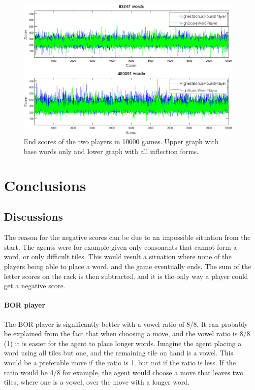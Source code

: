 \documentclass[a4paper, 12pt]{report}
\begin{document}
\begin{figure}[h]
\centering
\includegraphics[scale=0.4]{Highest_Bonus_Round_vs_High_Score_Word_10000_cropped}
\caption {End scores of the two players in 10000 games. Upper graph with base words only and lower graph with all inflection forms.}
\label{fig:bs+hsw+totalscores}
\end{figure}



\chapter{Conclusions}
\section{Discussions}
The reason for the negative scores can be due to an impossible situation from the start. The agents were for example given only consonants that cannot form a word, or only difficult tiles. This would result a situation where none of the players being able to place a word, and the game eventually ends. The sum of the letter scores on the rack is then subtracted, and it is the only way a player could get a negative score.

\subsubsection{BOR player}
The BOR player is significantly better with a vowel ratio of 8/8. It can probably be explained from the fact that when choosing a move, and the vowel ratio is 8/8 (1) it is easier for the agent to place longer words. Imagine the agent placing a word using all tiles but one, and the remaining tile on hand is a vowel. This would be a preferable move if the ratio is 1, but not if the ratio is less. If the ratio would be 4/8 for example, the agent would choose a move that leaves two tiles, where one is a vowel, over the move with a longer word. 
\end{document}
